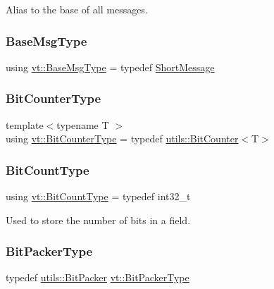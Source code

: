 Alias to the base of all messages. 

\mbox{\label{namespacevt_a44d0d4e144748f2b19a1cfd962f50338}} 
\subsubsection{\texorpdfstring{Base\+Msg\+Type}{BaseMsgType}}
{\footnotesize\ttfamily using \hyperlink{namespacevt_a44d0d4e144748f2b19a1cfd962f50338}{vt\+::\+Base\+Msg\+Type} = typedef \hyperlink{namespacevt_a1125ac1da6c0bbf141e0ea0739d7602d}{Short\+Message}}

\mbox{\label{namespacevt_a34b3eb2eea8db3cf4ae27ced35b19b46}} 
\subsubsection{\texorpdfstring{Bit\+Counter\+Type}{BitCounterType}}
{\footnotesize\ttfamily template$<$typename T $>$ \\
using \hyperlink{namespacevt_a34b3eb2eea8db3cf4ae27ced35b19b46}{vt\+::\+Bit\+Counter\+Type} = typedef \hyperlink{structvt_1_1utils_1_1_bit_counter}{utils\+::\+Bit\+Counter}$<$T$>$}

\mbox{\label{namespacevt_acaf7da00eb37dfb0c3479a6a982c30ef}} 
\subsubsection{\texorpdfstring{Bit\+Count\+Type}{BitCountType}}
{\footnotesize\ttfamily using \hyperlink{namespacevt_acaf7da00eb37dfb0c3479a6a982c30ef}{vt\+::\+Bit\+Count\+Type} = typedef int32\+\_\+t}



Used to store the number of bits in a field. 

\mbox{\label{namespacevt_a80d5091925c65efd88ca7f49fe1d633b}} 
\subsubsection{\texorpdfstring{Bit\+Packer\+Type}{BitPackerType}}
{\footnotesize\ttfamily typedef \hyperlink{structvt_1_1utils_1_1_bit_packer}{utils\+::\+Bit\+Packer} \hyperlink{namespacevt_a80d5091925c65efd88ca7f49fe1d633b}{vt\+::\+Bit\+Packer\+Type}}

